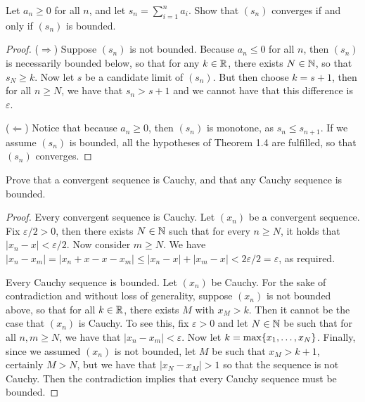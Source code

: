 \begin{exercise}{13}
Let $a_n\geq 0$ for all $n$, and let $s_n=\sum_{i=1}^na_i$. Show that $(s_n)$ converges if and only if $(s_n)$ is bounded.
\end{exercise}
\begin{proof}
($\Rightarrow$) Suppose $(s_n)$ is not bounded. Because $a_n\leq 0$ for all $n$, then $(s_n)$ is necessarily bounded below, so that for any $k\in\mathbb{R}$, there exists $N\in\mathbb{N}$, so that $s_N\geq k$. Now let $s$ be a candidate limit of $(s_n)$. But then choose $k=s+1$, then for all $n\geq N$, we have that $s_n>s+1$ and we cannot have that this difference is $\varepsilon$.

($\Leftarrow$) Notice that because $a_n\geq 0$, then $(s_n)$ is monotone, as $s_n\leq s_{n+1}$. If we assume $(s_n)$ is bounded, all the hypotheses of Theorem 1.4 are fulfilled, so that $(s_n)$ converges.
\end{proof}

\begin{exercise}{14}
Prove that a convergent sequence is Cauchy, and that any Cauchy sequence is bounded.
\end{exercise}
\begin{proof}
Every convergent sequence is Cauchy. Let $(x_n)$ be a convergent sequence. Fix $\varepsilon/2>0$, then there exists $N\in\mathbb{N}$ such that for every $n\geq N$, it holds that $\lvert x_n-x\rvert<\varepsilon/2$. Now consider $m\geq N$. We have $\lvert x_n-x_m\rvert = \lvert x_n+x-x-x_m\lvert \leq \lvert x_n-x\rvert + \lvert x_m-x\rvert<2\varepsilon/2=\varepsilon$, as required.

Every Cauchy sequence is bounded. Let $(x_n)$ be Cauchy. For the sake of contradiction and without loss of generality, suppose $(x_n)$ is not bounded above, so that for all $k\in\mathbb{R}$, there exists $M$ with $x_M>k$. Then it cannot be the case that $(x_n)$ is Cauchy. To see this, fix $\varepsilon>0$ and let $N\in\mathbb{N}$ be such that for all $n,m\geq N$, we have that $\lvert x_n-x_m\rvert<\varepsilon$. Now let $k=\max\{x_1,\dots,x_N\}$. Finally, since we assumed $(x_n)$ is not bounded, let $M$ be such that $x_M>k+1$, certainly $M>N$, but we have that $\lvert x_N-x_M\rvert>1$ so that the sequence is not Cauchy. Then the contradiction implies that every Cauchy sequence must be bounded.
\end{proof}

